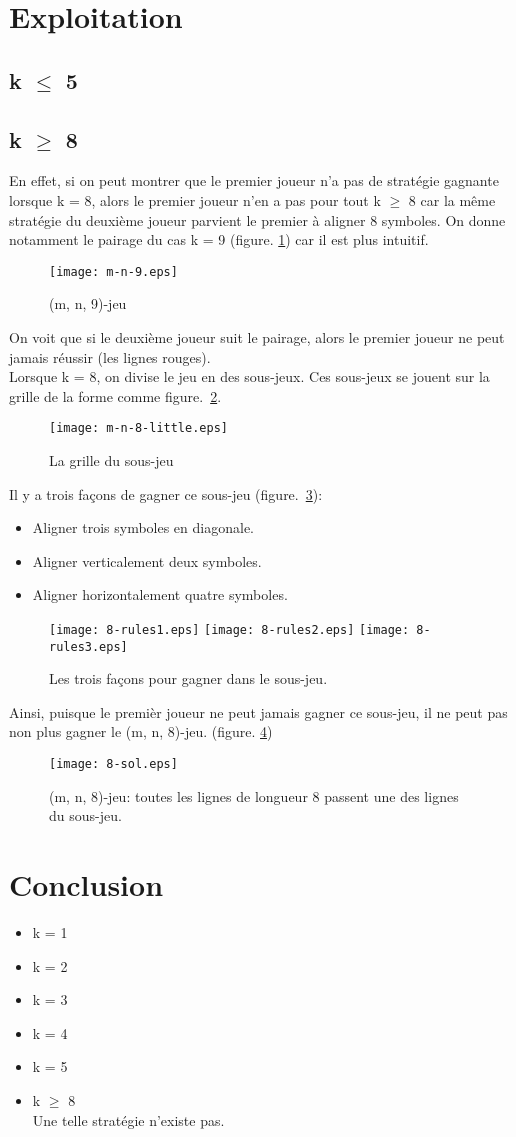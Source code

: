 \documentclass[12pt, a4paper]{article}
\begin{document}
\section{Exploitation}
\subsection*{k $\le$ 5}

\subsection*{k $\ge$ 8}
En effet, si on peut montrer que le premier joueur n'a pas de stratégie gagnante lorsque k = 8, alors le premier joueur n'en a pas pour tout k $\ge$ 8 car la même stratégie du deuxième joueur parvient le premier à aligner 8 symboles.
On donne notamment le pairage du cas k = 9 (figure. \ref{fig:m-n-9}) car il est plus intuitif.
\begin{figure}[h!]
    \centering
    \texttt{[image: m-n-9.eps]}
    \caption{(m, n, 9)-jeu}
    \label{fig:m-n-9}
\end{figure}
On voit que si le deuxième joueur suit le pairage, alors le premier joueur ne peut jamais réussir (les lignes rouges).\\
Lorsque k = 8, on divise le jeu en des sous-jeux. Ces sous-jeux se jouent sur la grille de la forme comme \mbox{figure. \ref{fig:sous-jeu}.}
\begin{figure}[h!]
    \centering
    \texttt{[image: m-n-8-little.eps]}
    \caption{La grille du sous-jeu}
    \label{fig:sous-jeu}
\end{figure}
Il y a trois façons de gagner ce sous-jeu \mbox{(figure. \ref{fig:regle}):}
\begin{itemize}
    \item Aligner trois symboles en diagonale.
    \item Aligner verticalement deux symboles.
    \item Aligner horizontalement quatre symboles.
\end{itemize}
\begin{figure}[h!]
    \centering
    \texttt{[image: 8-rules1.eps]}
    \texttt{[image: 8-rules2.eps]}
    \texttt{[image: 8-rules3.eps]}
    \caption{Les trois façons pour gagner dans le sous-jeu.}
    \label{fig:regle}
\end{figure}
Ainsi, puisque le premièr joueur ne peut jamais gagner ce sous-jeu, il ne peut pas non plus gagner le (m, n, 8)-jeu. (figure. \ref{fig:m-n-8})
\begin{figure}[h!]
    \centering
    \texttt{[image: 8-sol.eps]}
    \caption{(m, n, 8)-jeu:
    toutes les lignes de longueur 8 passent une des lignes du sous-jeu.}
    \label{fig:m-n-8}
\end{figure}
\section{Conclusion}

\begin{itemize}
    \item k = 1
    \item k = 2
    \item k = 3
    \item k = 4
    \item k = 5
    \item k $\ge$ 8\\
        Une telle stratégie n'existe pas.
\end{itemize}
\end{document}
